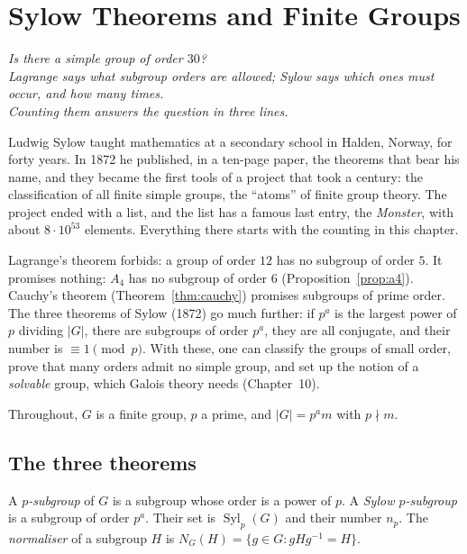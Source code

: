 \chapter{Sylow Theorems and Finite Groups}

\begin{center}\itshape
Is there a simple group of order $30$?\\
Lagrange says what subgroup orders are allowed; Sylow says which ones must occur, and how many times.\\
Counting them answers the question in three lines.
\end{center}

Ludwig Sylow taught mathematics at a secondary school in Halden, Norway, for forty years. In 1872 he published, in a ten-page paper, the
theorems that bear his name, and they became the first tools of a project that took a century: the classification of all finite simple groups,
the ``atoms'' of finite group theory. The project ended with a list, and the list has a famous last entry, the \emph{Monster}, with about
$8\cdot10^{53}$ elements. Everything there starts with the counting in this chapter.

Lagrange's theorem forbids: a group of order $12$ has no subgroup of order $5$. It promises nothing: $A_4$ has no subgroup of order $6$ (Proposition~\ref{prop:a4}). Cauchy's theorem (Theorem~\ref{thm:cauchy}) promises subgroups of prime order. The three theorems of Sylow (1872) go much further: if $p^a$ is the largest power of $p$ dividing $|G|$, there are subgroups of order $p^a$, they are all conjugate, and their number is $\equiv1\pmod p$. With these, one can classify the groups of small order, prove that many orders admit no simple group, and set up the notion of a \emph{solvable} group, which Galois theory needs (Chapter~10).

Throughout, $G$ is a finite group, $p$ a prime, and $|G|=p^am$ with $p\nmid m$.

\section{The three theorems}

\begin{definition}
A \emph{$p$-subgroup} of $G$ is a subgroup whose order is a power of $p$. A \emph{Sylow $p$-subgroup} is a subgroup of order $p^a$. Their set is $\operatorname{Syl}_p(G)$ and their number $n_p$. The \emph{normaliser} of a subgroup $H$ is $N_G(H)=\{g\in G:gHg^{-1}=H\}$.
\end{definition}


